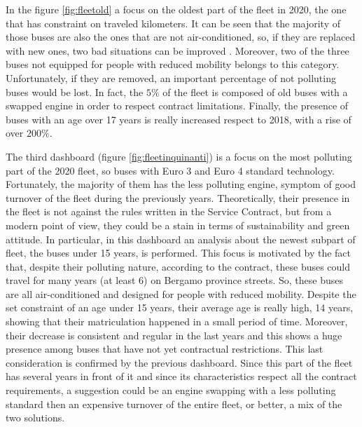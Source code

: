 \newpage
\begin{landscape}
\thispagestyle{empty}

\end{landscape}
\newpage

In the figure \ref{fig:fleetold}  a focus on the oldest part of the fleet in 2020, the one that has constraint on traveled kilometers. 
It can be seen that the majority of those buses are also the ones that are not air-conditioned, so, if they are replaced with new ones, two bad situations can be improved . Moreover, two of the three buses not equipped for people with reduced mobility belongs to this category. Unfortunately, if they are removed, an important percentage of not polluting buses would be lost. In fact, the $5\%$ of the fleet is composed of old buses with a swapped engine in order to respect contract limitations. Finally, the presence of buses with an age over 17 years is really increased respect to 2018, with a rise of over $200\%$.


The third dashboard (figure \ref{fig:fleetinquinanti}) is a focus on the most polluting part of the 2020 fleet, so buses with Euro 3 and Euro 4 standard technology. Fortunately, the majority of them has the less polluting engine, symptom of good turnover of the fleet during the previously years. Theoretically, their presence in the fleet is not against the rules written in the Service Contract, but from a modern point of view, they could be a stain in terms of sustainability and green attitude. In particular, in this dashboard an analysis about the newest subpart of fleet, the buses under 15 years, is performed. This focus is motivated by the fact that, despite their polluting nature, according to the contract, these buses could travel for many years (at least 6) on Bergamo province streets. So, these buses are all air-conditioned and designed for people with reduced mobility. Despite the set constraint of an age under 15 years, their average age is really high, 14 years, showing that their matriculation happened in a small period of time. Moreover, their decrease is consistent and regular in the last years and this shows a huge presence among buses that have not yet contractual restrictions. This last consideration is confirmed by the previous dashboard. Since this part of the fleet has several years in front of it and since its characteristics respect all the contract requirements, a suggestion could be an engine swapping with a less polluting standard then an expensive turnover of the entire fleet, or better, a mix of the two solutions.
\newpage
\begin{landscape}
\thispagestyle{empty}

\end{landscape}
\newpage



